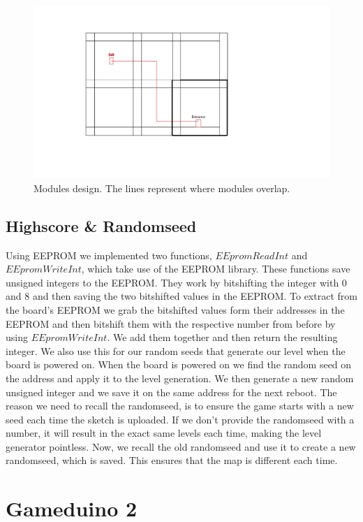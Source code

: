 \begin{figure}[h]
  \centering
  \includegraphics[scale=0.5]{Figures/Modules}
  \caption{Modules design. The lines represent where modules overlap.}
  \label{fig:Modules}
\end{figure}
\subsection*{Highscore \& Randomseed}
Using EEPROM we implemented two functions, $EEpromReadInt$ and $EEpromWriteInt$, which take use of the EEPROM library. These functions save unsigned integers to the EEPROM. They work by bitshifting the integer with 0 and 8 and then saving the two bitshifted values in the EEPROM. To extract from the board's EEPROM we grab the bitshifted values form their addresses in the EEPROM and then bitshift them with the respective number from before by using $EEpromWriteInt$. We add them together and then return the resulting integer.
\newline
We also use this for our random seeds that generate our level when the board is powered on. When the board is powered on we find the random seed on the address and apply it to the level generation. We then generate a new random unsigned integer and we save it on the same address for the next reboot.
\newline
The reason we need to recall the randomseed, is to ensure the game starts with a new seed each time the sketch is uploaded. If we don't provide the randomseed with a number, it will result in the exact same levels each time, making the level generator pointless. Now, we recall the old randomseed and use it to create a new randomseed, which is saved. This ensures that the map is different each time.

\section{Gameduino 2}
